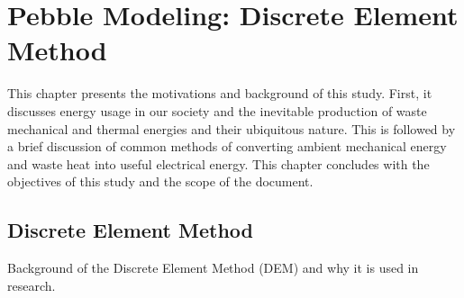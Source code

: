 \chapter{Pebble Modeling: Discrete Element Method} \label{modelingDEM}
This chapter presents the motivations and background of this study. First, it discusses energy usage in our society and the inevitable production of waste mechanical and thermal energies and their ubiquitous nature. This is followed by a brief discussion of common methods of converting ambient mechanical energy and waste heat into useful electrical energy. This chapter concludes with the objectives of this study and the scope of the document.


\section{Discrete Element Method}
Background of the Discrete Element Method (DEM) and why it is used in research.















